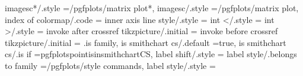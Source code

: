 {{{{{{{{{{{{{{{{{{{{{{{{{{{{{{{{{{{{{{{{{{{{{{{{{imagesc*/.style                                                    ={/pgfplots/matrix plot*},%
imagesc/.style                                                     ={/pgfplots/matrix plot},%
index of colormap/.code                                            ={%
inner axis line style/.style                                       ={                                                                                                                                  
int </.style                                                       ={%
int >/.style                                                       ={%
invoke after crossref tikzpicture/.initial                         ={%
invoke before crossref tikzpicture/.initial                        ={%
.is family,
is smithchart cs/.default                                          =true,                                                                                                                              
is smithchart cs/.is if                                            =pgfplotspointisinsmithchartCS,                                                                                                     
label shift/.style                                                 ={%
label style/.belongs to family                                     =/pgfplots/style commands,                                                                                                          
label style/.style                                                 ={%
}}}}}}}}}}}}}}}}}}}}}}}}}}}}}}}}}}}}}}}}}}}}}}}}}}}}}}}}}
